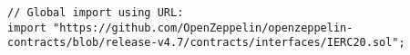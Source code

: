 \begin{lstlisting}[language=Solidity]
// Global import using URL:
import "https://github.com/OpenZeppelin/openzeppelin-contracts/blob/release-v4.7/contracts/interfaces/IERC20.sol";
\end{lstlisting}